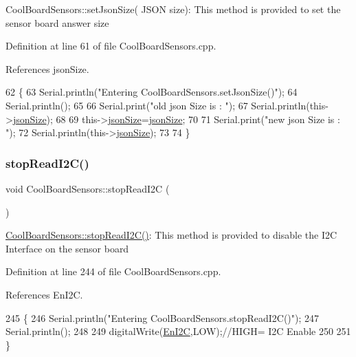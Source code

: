 Cool\+Board\+Sensors\+::set\+Json\+Size( J\+S\+O\+N size)\+: This method is provided to set the sensor board answer size 

Definition at line 61 of file Cool\+Board\+Sensors.\+cpp.



References json\+Size.


\begin{DoxyCode}
62 \{
63     Serial.println(\textcolor{stringliteral}{"Entering CoolBoardSensors.setJsonSize()"});
64     Serial.println();
65     
66     Serial.print(\textcolor{stringliteral}{"old json Size is : "});
67     Serial.println(this->\hyperlink{classCoolBoardSensors_a05a40dc80bfff14ffb830f549b876f8d}{jsonSize});
68         
69     this->\hyperlink{classCoolBoardSensors_a05a40dc80bfff14ffb830f549b876f8d}{jsonSize}=\hyperlink{classCoolBoardSensors_a05a40dc80bfff14ffb830f549b876f8d}{jsonSize};
70     
71     Serial.print(\textcolor{stringliteral}{"new json Size is : "});
72     Serial.println(this->\hyperlink{classCoolBoardSensors_a05a40dc80bfff14ffb830f549b876f8d}{jsonSize});
73     
74 \}
\end{DoxyCode}
\mbox{\label{classCoolBoardSensors_ab67b900b9e5e7c18d52d2d9107ba171b}} 
\subsubsection{\texorpdfstring{stop\+Read\+I2\+C()}{stopReadI2C()}}
{\footnotesize\ttfamily void Cool\+Board\+Sensors\+::stop\+Read\+I2C (\begin{DoxyParamCaption}{ }\end{DoxyParamCaption})}

\hyperlink{classCoolBoardSensors_ab67b900b9e5e7c18d52d2d9107ba171b}{Cool\+Board\+Sensors\+::stop\+Read\+I2\+C()}\+: This method is provided to disable the I2C Interface on the sensor board 

Definition at line 244 of file Cool\+Board\+Sensors.\+cpp.



References En\+I2C.


\begin{DoxyCode}
245 \{
246     Serial.println(\textcolor{stringliteral}{"Entering CoolBoardSensors.stopReadI2C()"});
247     Serial.println();
248 
249     digitalWrite(\hyperlink{classCoolBoardSensors_aaa6b5dbf3a6633bffd9d204d961096dc}{EnI2C},LOW);\textcolor{comment}{//HIGH= I2C Enable}
250 
251 \}
\end{DoxyCode}


